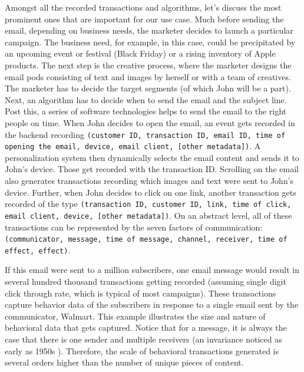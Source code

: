Amongst all the recorded transactions and algorithms, let's discuss the most prominent ones that are important for our use case. Much before sending the email, depending on business needs, the marketer decides to launch a particular campaign. The business need, for example, in this case, could be precipitated by an upcoming event or festival (Black Friday) or a rising inventory of Apple products. The next step is the creative process, where the marketer designs the email pods consisting of text and images by herself or with a team of creatives. The marketer has to decide the target segments (of which John will be a part). Next, an algorithm has to decide when to send the email and the subject line. Post this, a series of software technologies helps to send the email to the right people on time. When John decides to open the email, an event gets recorded in the backend recording \texttt{(customer ID, transaction ID, email ID, time of opening the email, device, email client, [other metadata])}. A personalization system then dynamically selects the email content and sends it to John's device. Those get recorded with the transaction ID. Scrolling on the email also generates transactions recording which images and text were sent to John's device. Further, when John decides to click on one link, another transaction gets recorded of the type \texttt{(transaction ID, customer ID, link, time of click, email client, device, [other metadata])}. On an abstract level, all of these transactions can be represented by the seven factors of communication: \texttt{(communicator, message, time of message, channel, receiver, time of effect, effect)}. 

If this email were sent to a million subscribers, one email message would result in several hundred thousand transactions getting recorded (assuming single digit click through rate, which is typical of most campaigns). These transactions capture behavior data of the subscribers in response to a single email sent by the communicator, Walmart. This example illustrates the size and nature of behavioral data that gets captured. Notice that for a message, it is always the case that there is one sender and multiple receivers (an invariance noticed as early as 1950s \cite{meier1959measurement}). Therefore, the scale of behavioral transactions generated is several orders higher than the number of unique pieces of content. 


